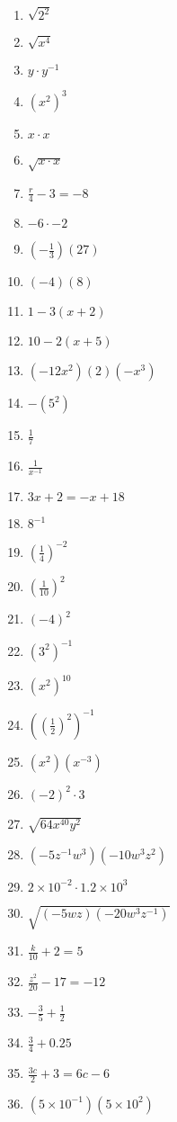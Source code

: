 \documentclass[12pt]{article}
\begin{document}
\Large
\begin{multicols}{2}
\begin{enumerate}
\item \( \sqrt{2^{2}} \)
\item \( \sqrt{x^{4}} \)
\item \( y \cdot y^{-1} \)
\item \( (x^{2})^{3} \)
\item \( x \cdot x \)
\item \( \sqrt{ x \cdot x } \)
\item \( \frac{r}{4} - 3 = -8 \)
\item \( -6 \cdot -2 \)
\item \( (-\frac{1}{3})(27) \)
\item \( (-4) (8) \)
\item \( 1 - 3(x+2) \)
\item \( 10 - 2(x+5) \)
\item \( (-12x^{2})(2)(-x^{3}) \)
\item \( -(5^{2}) \)
\item \( \frac{1}{7} \)
\item \( \frac{1}{x^{-1}} \)
\item \( 3x + 2 = -x + 18 \)
\item \( 8^{-1} \)
\item \( (\frac{1}{4})^{-2} \)
\item \( (\frac{1}{10})^{2} \)
\item \( (-4)^{2} \)
\item \( (3^{2})^{-1} \)
\item \( (x^{2})^{10} \)
\item \( ((\frac{1}{2})^{2})^{-1} \)
\item \( (x^{2})(x^{-3}) \)
\item \( (-2)^{2} \cdot 3 \)
\item \( \sqrt{64x^{40}y^{2}} \)
\item \( (-5z^{-1}w^{3})(-10w^{3}z^{2}) \)
\item \( 2 \times 10^{-2} \cdot 1.2 \times 10^{3}\)
\item \( \sqrt{ (-5wz)(-20w^{3}z^{-1}) } \)
\item \( \frac{k}{10} + 2 = 5 \)
\item \( \frac{z^{2}}{20} - 17 = -12 \)
\item \( -\frac{3}{5} + \frac{1}{2} \)
\item \( \frac{3}{4} + 0.25 \)
\item \( \frac{3c}{2} + 3 = 6c - 6 \)
\item \( (5 \times 10^{-1})(5 \times 10^{2}) \)
\end{enumerate}
\end{multicols}
\end{document}
